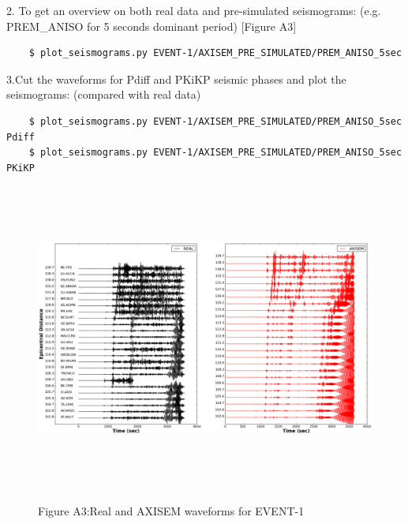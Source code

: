 \documentclass{article}
\begin{document}
\baselineskip=13pt
\leftskip=0pt
2. To get an overview on both real data and pre-simulated seismograms: (e.g. PREM\_ANISO 
for 5 seconds dominant period) [Figure A3]
\begin{verbatim}
    $ plot_seismograms.py EVENT-1/AXISEM_PRE_SIMULATED/PREM_ANISO_5sec
\end{verbatim}

3.Cut the waveforms for Pdiff and PKiKP seismic phases and plot the seismograms: 
(compared with real data)
\begin{verbatim}
    $ plot_seismograms.py EVENT-1/AXISEM_PRE_SIMULATED/PREM_ANISO_5sec Pdiff
    $ plot_seismograms.py EVENT-1/AXISEM_PRE_SIMULATED/PREM_ANISO_5sec PKiKP
\end{verbatim}

\begin{figure}
\includegraphics[width=497pt, height=287pt, keepaspectratio=true]{AXISEMTutorial-fig007.png}
\begin{center}
{\small{}Figure A3:Real and AXISEM waveforms for EVENT-1}
\end{center}
\end{figure}
\end{document}
